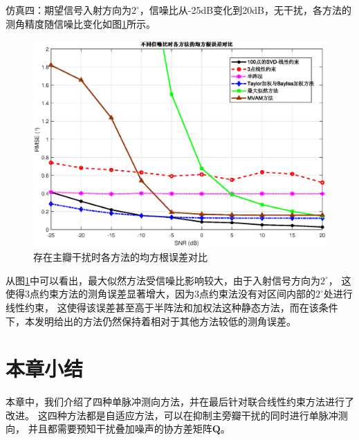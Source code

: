 \documentclass[master]{thesis-uestc}
\begin{document}
仿真四：期望信号入射方向为$2^\circ$，信噪比从-25dB变化到20dB，无干扰，各方法的测角精度随信噪比变化如图\ref{SVD-JLC_RMSE_SNR}所示。
\begin{figure}[H]
    \includegraphics[scale=0.5]{pic/SVD-JLC_RMSE_SNR.eps}
    \caption{存在主瓣干扰时各方法的均方根误差对比}
    \label{SVD-JLC_RMSE_SNR}
\end{figure}
从图\ref{SVD-JLC_RMSE_SNR}中可以看出，最大似然方法受信噪比影响较大，由于入射信号方向为$2^\circ$，
这使得3点约束方法的测角误差显著增大，因为3点约束法没有对区间内部的$2^\circ$处进行线性约束，
这使得该误差甚至高于半阵法和加权法这种静态方法，而在该条件下，本发明给出的方法仍然保持着相对于其他方法较低的测角误差。

\section{本章小结}
本章中，我们介绍了四种单脉冲测向方法，并在最后针对联合线性约束方法进行了改进。
这四种方法都是自适应方法，可以在抑制主旁瓣干扰的同时进行单脉冲测向，
并且都需要预知干扰叠加噪声的协方差矩阵$\bm{Q}$。
\end{document}
